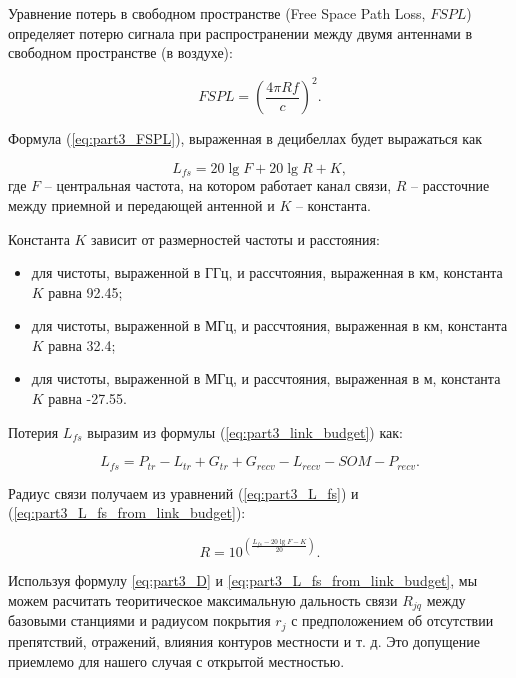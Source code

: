 Уравнение потерь в свободном пространстве (Free Space Path Loss, $FSPL $) определяет потерю сигнала при распространении между двумя антеннами в свободном пространстве (в воздухе):

\begin{equation}
  \label{eq:part3_FSPL}
  FSPL = \left(\frac{4\pi R f}{c} \right)^2.
\end{equation}

Формула (\cref{eq:part3_FSPL}), выраженная в децибеллах будет выражаться как

\begin{equation}
  \label{eq:part3_L_fs}
  L_{fs} = 20 \lg{F} + 20\lg{R} + K,
  \end{equation}
где $F$ -- центральная частота, на котором работает канал связи, $R$ -- рассточние между приемной и передающей антенной и $K$ -- константа.

Константа $K$ зависит от размерностей частоты и расстояния:

\begin{itemize}
  \item для чистоты, выраженной в ГГц, и рассчтояния, выраженная в км, константа $K$ равна 92.45;
  \item для чистоты, выраженной в МГц, и рассчтояния, выраженная в км, константа $K$ равна 32.4;
  \item для чистоты, выраженной в МГц, и рассчтояния, выраженная в м, константа $K$ равна -27.55.
\end{itemize} 

Потерия $L_{fs}$ выразим из формулы (\cref{eq:part3_link_budget}) как:

\begin{equation}
  \label{eq:part3_L_fs_from_link_budget}
  L_{fs} = P_{tr} - L_{tr} + G_{tr} + G_{recv} - L_{recv} - SOM - P_{recv}.
\end{equation}

Радиус связи получаем из уравнений (\cref{eq:part3_L_fs}) и (\cref{eq:part3_L_fs_from_link_budget}):

\begin{equation}
  \label{eq:part3_D}
  R = 10^{\left(\frac{L_{fs} - 20\lg{F} - K}{20}\right)}.
\end{equation}

Используя формулу \cref{eq:part3_D} и \cref{eq:part3_L_fs_from_link_budget}, мы можем расчитать теоритическое максимальную дальность связи $ R_{jq}$ между базовыми станциями и радиусом покрытия $ r_j $ с предположением об отсутствии препятствий, отражений, влияния контуров местности и т. д. Это допущение приемлемо для нашего случая с открытой местностью.

